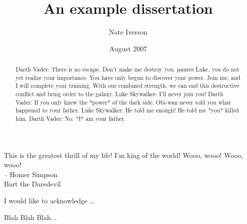 \documentclass{BGSU}
\title{An example dissertation}
\author{Nate Iverson}
\date{August 2007}
\begin{document}
\frontmatter %

\maketitle 

\copyrightpage %

\begin{abstract}

Darth Vader:
	There is no escape. Don't make me destroy you.
	pauses Luke, you do not yet realize your importance.
	You have only begun to discover your power. Join me,
	and I will complete your training. With our combined
	strength, we can end this destructive conflict and
	bring order to the galaxy.
Luke Skywalker:
	I'll never join you!
Darth Vader:
	If you only knew the *power* of the dark side. Obi-wan
	never told you what happened to your father.
Luke Skywalker:
	He told me enough! He told me *you* killed him.
Darth Vader:
	No. *I* am your father.
\end{abstract}

\begin{dedication}
\begin{minipage}{5in}
This is the greatest thrill of my life!  I'm king of the world!  Wooo,
wooo!  Wooo, wooo!\\

		-- Homer Simpson\\
		   Bart the Daredevil
\end{minipage}
\end{dedication}

\begin{acknowledgments}
I would like to acknowledge \ldots\

\end{acknowledgments}

\tableofcontents

\listoffigures

\listoftables

\begin{preface}
\thispagestyle{myheadings}
Blah Blah Blah...

\end{preface}
\end{document}
